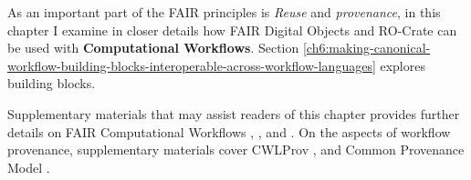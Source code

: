 As an important part of the FAIR principles is \emph{Reuse} and \emph{provenance}, in this chapter I examine in closer details how FAIR Digital Objects and RO-Crate can be used with \textbf{Computational Workflows}. 
Section \vref{ch6:making-canonical-workflow-building-blocks-interoperable-across-workflow-languages} explores building blocks.

Supplementary materials that may assist readers of this chapter provides further details on FAIR Computational Workflows \cite{Goble 2020},  \cite{Goble 2021},  \cite{Crusoe 2022} and  \cite{ch6-37}. 
On the aspects of workflow provenance, supplementary materials cover CWLProv \cite{Khan 2019},  \cite{De Geest 2022} and Common Provenance Model \cite{Wittner 2020,Wittner 2023}.
